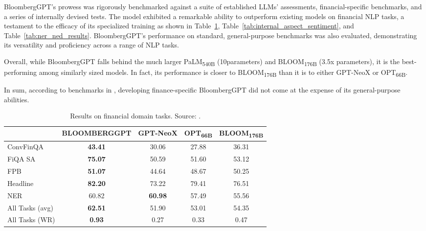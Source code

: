 BloombergGPT's prowess was rigorously benchmarked against a suite of established LLMs' assessments, financial-specific benchmarks, and a series of internally devised tests.
The model exhibited a remarkable ability to outperform existing models on financial NLP tasks, a testament to the efficacy of its specialized training as shown in Table~\ref{tab:financial_tasks}, Table~\ref{tab:internal_aspect_sentiment}, and Table~\ref{tab:ner_ned_results}.
BloombergGPT's performance on standard, general-purpose benchmarks was also evaluated, demonstrating its versatility and proficiency across a range of NLP tasks.

Overall, while BloombergGPT falls behind the much larger PaLM\textsubscript{540B} (10\texttimes parameters) and BLOOM\textsubscript{176B} (3.5x parameters), it is the best-performing among similarly sized models.
In fact, its performance is closer to BLOOM\textsubscript{176B} than it is to either GPT-NeoX or OPT\textsubscript{66B}.

In sum, according to benchmarks in \textcite{wu2023bloomberggpt}, developing finance-specific BloombergGPT did not come at the expense of its general-purpose abilities.


\begin{table}[h]
	\begin{tabularx}{\textwidth}{Xcccc}
		\toprule
		                & \textbf{BLOOMBERGGPT} & \textbf{GPT-NeoX} & \textbf{OPT\textsubscript{66B}} & \textbf{BLOOM\textsubscript{176B}} \\
		\midrule
		ConvFinQA       & \textbf{43.41}        & 30.06             & 27.88                           & 36.31                              \\
		FiQA SA         & \textbf{75.07}        & 50.59             & 51.60                           & 53.12                              \\
		FPB             & \textbf{51.07}        & 44.64             & 48.67                           & 50.25                              \\
		Headline        & \textbf{82.20}        & 73.22             & 79.41                           & 76.51                              \\
		NER             & 60.82                 & \textbf{60.98}    & 57.49                           & 55.56                              \\
		\midrule
		All Tasks (avg) & \textbf{62.51}        & 51.90             & 53.01                           & 54.35                              \\
		All Tasks (WR)  & \textbf{0.93}         & 0.27              & 0.33                            & 0.47                               \\
		\bottomrule
	\end{tabularx}
	\caption{Results on financial domain tasks. Source: \protect\textcite{wu2023bloomberggpt}.}
	\label{tab:financial_tasks}
\end{table}

